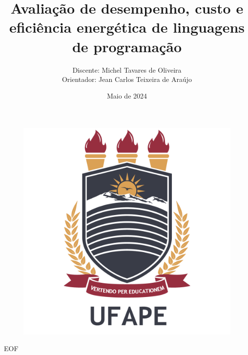 \documentclass[aspectratio=169]{beamer}
\author{Discente: Michel Tavares de Oliveira  \\ Orientador: Jean Carlos Teixeira de Araújo}
\title[Avaliação de desempenho, custo e eficiência
energética de linguagens de programação]{Avaliação de desempenho, custo e eficiência
energética de linguagens de programação}
\institute{Universidade Federal do Agreste de Pernambuco}
\date{Maio de 2024}
\begin{document}
\begin{frame}
    \titlepage
    \vspace{-10pt}
    \begin{figure}[htpb]
        \begin{center}
            \includegraphics[width=0.13\linewidth]{images/ufapelogo.png}
        \end{center}
    \end{figure}
\end{frame}

\begin{frame}
    \tableofcontents[sectionstyle=show,subsectionstyle=show/shaded/hide,subsubsectionstyle=show/shaded/hide]
\end{frame}












%







\begin{frame}[allowframebreaks]
    \printbibliography
\end{frame}

\begin{frame}
    \begin{center}
        {\Huge EOF}
    \end{center}
\end{frame}
\end{document}
